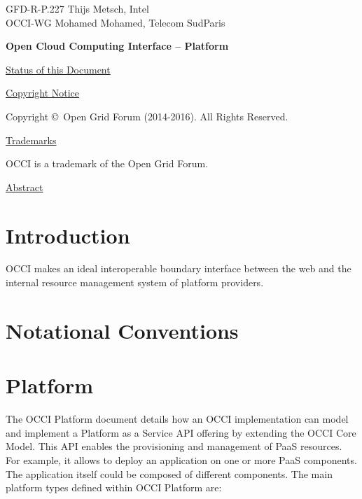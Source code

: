\documentclass[10pt,a4paper]{article}
\begin{document}
\thispagestyle{empty}

GFD-R-P.227 \hfill  Thijs Metsch, Intel\\
OCCI-WG \hfill  Mohamed Mohamed, Telecom SudParis\\
\rightline {\today}

\vspace*{0.5in}

\begin{Large}
\textbf{Open Cloud Computing Interface -- Platform}
\end{Large}

\vspace*{0.5in}

\underline{Status of this Document}



\underline{Copyright Notice}

Copyright \copyright ~Open Grid Forum (2014-2016). All Rights
Reserved.

\underline{Trademarks}

OCCI is a trademark of the Open Grid Forum.

\underline{Abstract}



\newpage
\tableofcontents
\newpage

\section{Introduction}


OCCI makes an ideal interoperable boundary interface between the web
and the internal resource management system of platform providers.

\section{Notational Conventions}



\section{Platform}

The OCCI Platform document details how an OCCI implementation can model and implement a Platform as a Service API offering by extending the OCCI Core Model. This API enables the provisioning and management of PaaS resources. For example, it allows to deploy an application on one or more PaaS components. The application itself could be composed of different components. The main platform types defined within OCCI Platform are:
\end{document}
